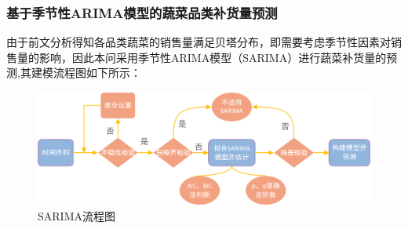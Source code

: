 \documentclass{my_paper}
\begin{document}
\subsubsection{基于季节性ARIMA模型的蔬菜品类补货量预测}
由于前文分析得知各品类蔬菜的销售量满足贝塔分布，即需要考虑季节性因素对销售量的影响，因此本问采用季节性ARIMA模型（SARIMA）进行蔬菜补货量的预测\cite{nosek2002math},其建模流程图如下所示：
\begin{figure}[H]
 \centering
 \includegraphics[width=\textwidth]{SARIMA流程图.png} 
 \caption{SARIMA流程图} %
 \label{SARIMA流程图} %
\end{figure}\par
\end{document}
